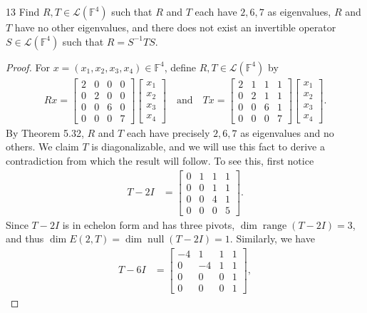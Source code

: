 \documentclass{extarticle}
\newenvironment{problem}[1]{\begin{prob*}{#1}{}}{\end{prob*}}
\newcommand{\F}{\mathbb{F}}
\newcommand{\Hom}{\mathcal{L}}
\DeclareMathOperator{\Null}{null}
\DeclareMathOperator{\Range}{range}
\begin{document}
\begin{problem}{13}
Find $R,T\in\Hom(\F^4)$ such that $R$ and $T$ each have $2, 6, 7$ as eigenvalues, $R$ and $T$ have no other eigenvalues, and there does not exist an invertible operator $S\in\Hom(\F^4)$ such that $R=S^{-1}TS$.
\end{problem}
\begin{proof}
For $x = (x_1, x_2, x_3, x_4) \in \F^4$, define $R, T\in\Hom(\F^4)$ by
\begin{align*}
Rx = \begin{bmatrix}2 & 0 & 0 & 0\\ 0 & 2 & 0 & 0\\ 0 & 0 & 6 & 0\\0 & 0 & 0 & 7  \end{bmatrix}\begin{bmatrix}x_1\\x_2\\x_3\\x_4\end{bmatrix}
\quad\text{and}\quad 
Tx = \begin{bmatrix}2 & 1 & 1 & 1\\ 0 & 2 & 1 & 1\\ 0 & 0 & 6 & 1\\0 & 0 & 0 & 7  \end{bmatrix}\begin{bmatrix}x_1\\x_2\\x_3\\x_4\end{bmatrix}.
\end{align*}
By Theorem 5.32, $R$ and $T$ each have precisely $2, 6, 7$ as eigenvalues and no others.  We claim $T$ is diagonalizable, and we will use this fact to derive a contradiction from which the result will follow.  To see this, first notice
\begin{align*}
T - 2 I &= \begin{bmatrix}0 & 1 & 1 & 1\\ 0 & 0 & 1 & 1\\ 0 & 0 & 4 & 1\\0 & 0 & 0 & 5  \end{bmatrix}.
\end{align*}
Since $T- 2I$ is in echelon form and has three pivots, $\dim\Range(T-2I) = 3$, and thus $\dim E(2,T) = \dim\Null(T - 2I) = 1$.  Similarly, we have
\begin{align*}
T - 6I &= \begin{bmatrix}-4 & 1 & 1 & 1\\ 0 & -4 & 1 & 1\\ 0 & 0 & 0 & 1\\0 & 0 & 0 & 1  \end{bmatrix}, 

\end{align*}
\end{proof}
\end{document}
